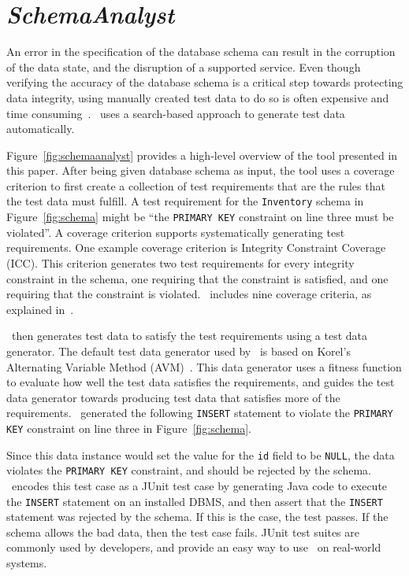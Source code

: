 \section{\textit{SchemaAnalyst}}\label{sec:technique}

An error in the specification of the database schema can result in the corruption of the data state, and the disruption
of a supported service.  Even though verifying the accuracy of the database schema is a critical step towards protecting
data integrity, using manually created test data to do so is often expensive and time consuming~\cite{kapfhammer2013search}.
\sa~uses a search-based approach to generate test data automatically.

Figure~\ref{fig:schemaanalyst} provides a high-level overview of the tool presented in this paper.  After being given
database schema as input, the tool uses a coverage criterion to first create a collection of test requirements that are
the rules that the test data must fulfill.  A test requirement for the \texttt{Inventory} schema in
Figure~\ref{fig:schema} might be ``the \texttt{PRIMARY KEY} constraint on line three must be violated''. A coverage
criterion supports systematically generating test requirements.  One example coverage criterion is Integrity Constraint
Coverage (ICC). This criterion generates two test requirements for every integrity constraint in the schema, one
requiring that the constraint is satisfied, and one requiring that the constraint is violated.  \sa~includes nine
coverage criteria, as explained in~\cite{mcminn2015effectiveness}.

\sa~then generates test data to satisfy the test requirements using a test data generator. The
default test data generator used by \sa~is based on Korel's Alternating Variable Method
(AVM)~\cite{Korel:AVM}.  This data generator uses a fitness function to evaluate how well the test data satisfies the
requirements, and guides the test data generator towards producing test data that satisfies more of the requirements.
\sa~generated the following \texttt{INSERT} statement to violate the \texttt{PRIMARY KEY} constraint
on line three in Figure~\ref{fig:schema}.



Since this data instance would set the value for the \texttt{id} field to be \texttt{NULL}, the data violates the
\texttt{PRIMARY KEY} constraint, and should be rejected by the schema.  \sa~encodes this test case as a JUnit test case
by generating Java code to execute the \texttt{INSERT} statement on an installed DBMS, and then assert that the
\texttt{INSERT} statement was rejected by the schema. If this is the case, the test passes.  If the schema allows the
bad data, then the test case fails. JUnit test suites are commonly used by developers, and provide an easy way to use
\sa~on real-world systems.

